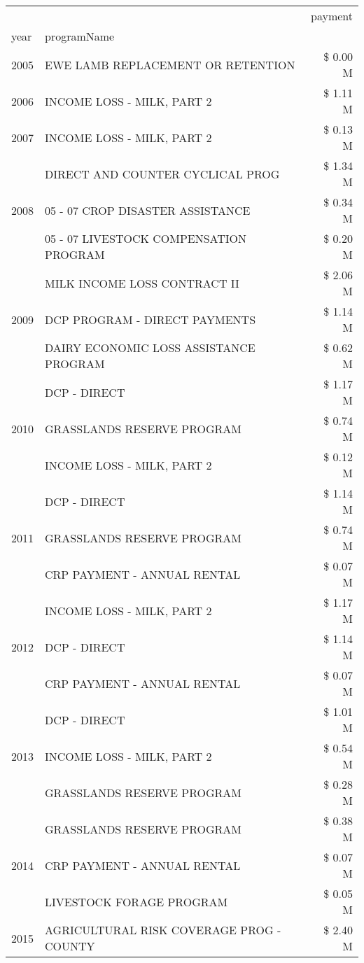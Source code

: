 \begin{tabular}{llr}
\toprule
 &  & payment \\
year & programName &  \\
\midrule
2005 & EWE LAMB REPLACEMENT OR RETENTION & \$ 0.00 M \\
\cline{1-3}
2006 & INCOME LOSS - MILK, PART 2 & \$ 1.11 M \\
\cline{1-3}
2007 & INCOME LOSS - MILK, PART 2 & \$ 0.13 M \\
\cline{1-3}
\multirow[t]{3}{*}{2008} & DIRECT AND COUNTER CYCLICAL PROG & \$ 1.34 M \\
 & 05 - 07 CROP DISASTER ASSISTANCE & \$ 0.34 M \\
 & 05 - 07 LIVESTOCK COMPENSATION PROGRAM & \$ 0.20 M \\
\cline{1-3}
\multirow[t]{3}{*}{2009} & MILK INCOME LOSS CONTRACT II & \$ 2.06 M \\
 & DCP PROGRAM - DIRECT PAYMENTS & \$ 1.14 M \\
 & DAIRY ECONOMIC LOSS ASSISTANCE PROGRAM & \$ 0.62 M \\
\cline{1-3}
\multirow[t]{3}{*}{2010} & DCP - DIRECT & \$ 1.17 M \\
 & GRASSLANDS RESERVE PROGRAM & \$ 0.74 M \\
 & INCOME LOSS - MILK, PART 2 & \$ 0.12 M \\
\cline{1-3}
\multirow[t]{3}{*}{2011} & DCP - DIRECT & \$ 1.14 M \\
 & GRASSLANDS RESERVE PROGRAM & \$ 0.74 M \\
 & CRP PAYMENT - ANNUAL RENTAL & \$ 0.07 M \\
\cline{1-3}
\multirow[t]{3}{*}{2012} & INCOME LOSS - MILK, PART 2 & \$ 1.17 M \\
 & DCP - DIRECT & \$ 1.14 M \\
 & CRP PAYMENT - ANNUAL RENTAL & \$ 0.07 M \\
\cline{1-3}
\multirow[t]{3}{*}{2013} & DCP - DIRECT & \$ 1.01 M \\
 & INCOME LOSS - MILK, PART 2 & \$ 0.54 M \\
 & GRASSLANDS RESERVE PROGRAM & \$ 0.28 M \\
\cline{1-3}
\multirow[t]{3}{*}{2014} & GRASSLANDS RESERVE PROGRAM & \$ 0.38 M \\
 & CRP PAYMENT - ANNUAL RENTAL & \$ 0.07 M \\
 & LIVESTOCK FORAGE PROGRAM & \$ 0.05 M \\
\cline{1-3}
\multirow[t]{3}{*}{2015} & AGRICULTURAL RISK COVERAGE PROG - COUNTY & \$ 2.40 M \\

\end{tabular}
